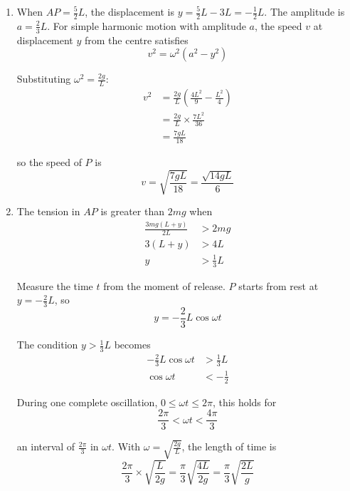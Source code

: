 \documentclass[leqno]{article}
\begin{document}
\begin{enumerate}[
  label=\textbf{\arabic*.},
  leftmargin=*,
  topsep=0pt,
  partopsep=0pt,
  parsep=0pt
]
\begin{djsSolution}
\begin{enumerate}[label=\textbf{(\alph*)}, start=1]
\(P\) is released from rest at \(C\), where \(y=-\frac{2}{3}L\), so the amplitude is \(\frac{2}{3}L\) and \(-\frac{2}{3}L\le y\le\frac{2}{3}L\) throughout the motion. The extension of \(AP\) is then at least \(L-\frac{2}{3}L=\frac{1}{3}L>0\), and the extension of \(BP\) is at least \(3L-\frac{2}{3}L=\frac{7}{3}L>0\), so both strings stay taut and the equation of motion holds throughout.

The period is
\[
\frac{2\pi}{\omega}=2\pi\sqrt{\frac{L}{2g}}=\pi\sqrt{\frac{4L}{2g}}=\pi\sqrt{\frac{2L}{g}}
\]

as required.

\item When \(AP=\frac{5}{2}L\), the displacement is \(y=\frac{5}{2}L-3L=-\frac{1}{2}L\). The amplitude is \(a=\frac{2}{3}L\). For simple harmonic motion with amplitude \(a\), the speed \(v\) at displacement \(y\) from the centre satisfies
\[
v^2=\omega^2\left(a^2-y^2\right)
\]

Substituting \(\omega^2=\frac{2g}{L}\):
\begin{align*}
v^2&=\frac{2g}{L}\left(\frac{4L^2}{9}-\frac{L^2}{4}\right)\\
&=\frac{2g}{L}\times\frac{7L^2}{36}\\
&=\frac{7gL}{18}
\end{align*}

so the speed of \(P\) is
\[
v=\sqrt{\frac{7gL}{18}}=\frac{\sqrt{14gL}}{6}
\]

\item The tension in \(AP\) is greater than \(2mg\) when
\begin{align*}
\frac{3mg(L+y)}{2L}&>2mg\\
3(L+y)&>4L\\
y&>\frac{1}{3}L
\end{align*}

Measure the time \(t\) from the moment of release. \(P\) starts from rest at \(y=-\frac{2}{3}L\), so
\[
y=-\frac{2}{3}L\cos\omega t
\]

The condition \(y>\frac{1}{3}L\) becomes
\begin{align*}
-\frac{2}{3}L\cos\omega t&>\frac{1}{3}L\\
\cos\omega t&<-\frac{1}{2}
\end{align*}

During one complete oscillation, \(0\le\omega t\le 2\pi\), this holds for
\[
\frac{2\pi}{3}<\omega t<\frac{4\pi}{3}
\]

an interval of \(\frac{2\pi}{3}\) in \(\omega t\). With \(\omega=\sqrt{\frac{2g}{L}}\), the length of time is
\[
\frac{2\pi}{3}\times\sqrt{\frac{L}{2g}}=\frac{\pi}{3}\sqrt{\frac{4L}{2g}}=\frac{\pi}{3}\sqrt{\frac{2L}{g}}
\]
\end{enumerate}
\end{djsSolution}


\end{enumerate}
\end{document}
